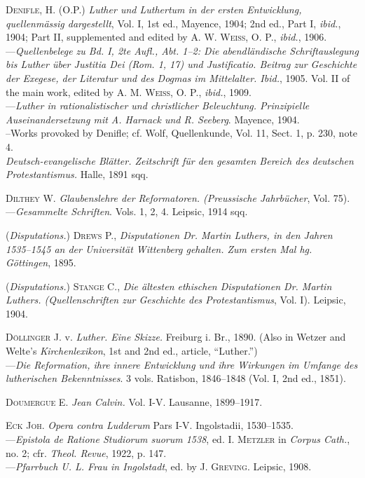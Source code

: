 \textsc{Denifle, H.} (O.P.) \textit{Luther und Luthertum in der ersten Entwicklung,
quellenmässig dargestellt}, Vol. I, 1st ed., Mayence, 1904; 2nd ed., Part I,
\textit{ibid.}, 1904; Part II, supplemented and edited by \textsc{A. W. Weiss, O. P.},
\textit{ibid.}, 1906.\\
---\textit{Quellenbelege zu Bd. I, 2te Aufl., Abt. 1--2: Die abendländische
Schriftauslegung bis Luther über Justitia Dei (Rom. 1, 17) und
Justificatio. Beitrag zur Geschichte der Exegese, der Literatur und des Dogmas
im Mittelalter. Ibid.}, 1905. Vol. II of the main work, edited by \textsc{A. M.
Weiss, O. P.}, \textit{ibid.}, 1909.\\
---\textit{Luther in rationalistischer und christlicher Beleuchtung. Prinzipielle
Auseinandersetzung mit A. Harnack und R. Seeberg}. Mayence, 1904.\\
--Works provoked by Denifle; cf. Wolf, Quellenkunde, Vol. 11, Sect. 1, p.
230, note 4.\\

\textit{Deutsch-evangelische Blätter. Zeitschrift für den gesamten Bereich des deutschen
Protestantismus.} Halle, 1891 sqq.

\textsc{Dilthey W.} \textit{Glaubenslehre der Reformatoren. (Preussische Jahrbücher}, Vol.
75). \\
---\textit{Gesammelte Schriften}. Vols. 1, 2, 4. Leipsic, 1914 sqq.

(\textit{Disputations.}) \textsc{Drews P.}, \textit{Disputationen Dr. Martin Luthers, in den
Jahren 1535--1545 an der Universität Wittenberg gehalten. Zum ersten
Mal hg. Göttingen}, 1895.

(\textit{Disputations.}) \textsc{Stange C.}, \textit{Die ältesten ethischen Disputationen Dr. Martin
Luthers. (Quellenschriften zur Geschichte des Protestantismus}, Vol. I).
Leipsic, 1904.

\textsc{Döllinger} J. v. \textit{Luther. Eine Skizze.} Freiburg i. Br., 1890. (Also in Wetzer
and Welte’s \textit{Kirchenlexikon}, 1st and 2nd ed., article, “Luther.”) \\
---\textit{Die Reformation, ihre innere Entwicklung und ihre Wirkungen im
Umfange des lutherischen Bekenntnisses}. 3 vols. Ratisbon, 1846--1848 (Vol.
I, 2nd ed., 1851).

\textsc{Doumergue E.} \textit{Jean Calvin.} Vol. I-V. Lausanne, 1899--1917.

\textsc{Eck Joh}. \textit{Opera contra Ludderum} Pars I-V. Ingolstadii, 1530--1535. \\
---\textit{Epistola de Ratione Studiorum suorum 1538}, ed. \textsc{I. Metzler} in \textit{Corpus
Cath.}, no. 2; cfr. \textit{Theol. Revue}, 1922, p. 147. \\
---\textit{Pfarrbuch U. L. Frau in Ingolstadt}, ed. by \textsc{J. Greving.} Leipsic, 1908.

